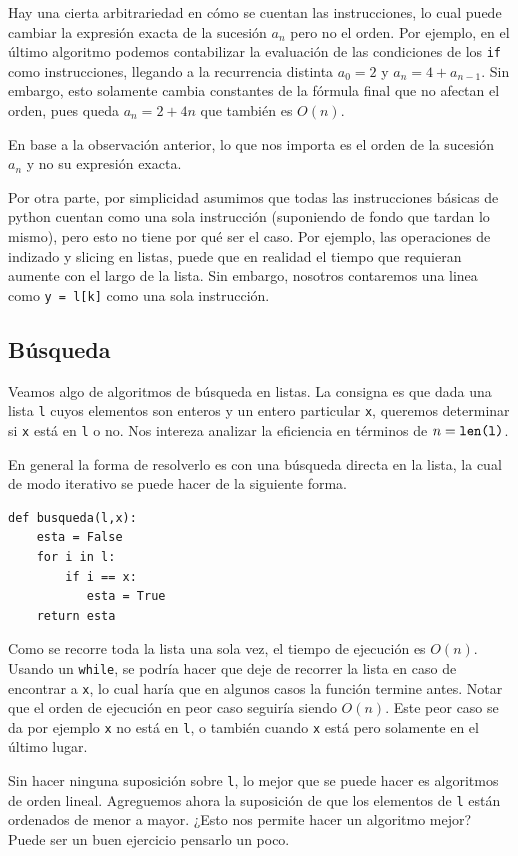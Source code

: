 \documentclass[a4paper, 12pt]{report}
\newcommand{\te}{\text}
\theoremstyle{definition}
\begin{document}
Hay una cierta arbitrariedad en cómo se cuentan las instrucciones, lo cual puede cambiar la expresión exacta de la sucesión $a_n$ pero no el orden.
Por ejemplo, en el último algoritmo podemos contabilizar la evaluación de las condiciones de los {\tt if} como instrucciones, llegando a la recurrencia distinta $a_0=2$ y $a_n = 4 + a_{n-1}$. Sin embargo, esto solamente cambia constantes de la fórmula final que no afectan el orden, pues queda $a_n = 2 + 4n$ que también es $O(n)$.

En base a la observación anterior, lo que nos importa es el orden de la sucesión $a_n$ y no su expresión exacta.

Por otra parte, por simplicidad asumimos que todas las instrucciones básicas de python cuentan como una sola instrucción (suponiendo de fondo que tardan lo mismo), pero esto no tiene por qué ser el caso. Por ejemplo, las operaciones de indizado y slicing en listas, puede que en realidad el tiempo que requieran aumente con el largo de la lista. Sin embargo, nosotros contaremos una linea como {\tt y = l[k]} como una sola instrucción.

\subsection{Búsqueda}\label{sec-busqueda}

Veamos algo de algoritmos de búsqueda en listas. La consigna es que dada una lista {\tt l} cuyos elementos son enteros y un entero particular {\tt x}, queremos determinar si {\tt x} está en {\tt l} o no. Nos intereza analizar la eficiencia en términos de $n=\te{{\tt len(l)}}$.

En general la forma de resolverlo es con una búsqueda directa en la lista, la cual de modo iterativo se puede hacer de la siguiente forma.
\begin{verbatim}
def busqueda(l,x):
    esta = False
    for i in l:
        if i == x:
           esta = True
    return esta
\end{verbatim}
Como se recorre toda la lista una sola vez, el tiempo de ejecución es $O(n)$. Usando un {\tt while}, se podría hacer que deje de recorrer la lista en caso de encontrar a {\tt x}, lo cual haría que en algunos casos la función termine antes. Notar que el orden de ejecución en peor caso seguiría siendo $O(n)$. Este peor caso se da por ejemplo {\tt x} no está en {\tt l}, o también cuando {\tt x} está pero solamente en el último lugar.

Sin hacer ninguna suposición sobre {\tt l}, lo mejor que se puede hacer es algoritmos de orden lineal. Agreguemos ahora la suposición de que los elementos de {\tt l} están ordenados de menor a mayor. ¿Esto nos permite hacer un algoritmo mejor? Puede ser un buen ejercicio pensarlo un poco.
\end{document}
